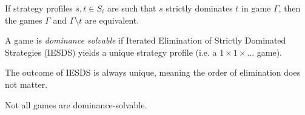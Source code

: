 	\begin{fact}
		If strategy profiles $s,t \in S_i$ are such that $s$ strictly dominates
		$t$ in game $\Gamma$, then the games $\Gamma$ and $\Gamma \setminus t$
		are equivalent.
	\end{fact}

	\begin{definition}
		A game is \textit{dominance solvable} if Iterated Elimination of
		Strictly Dominated Strategies (IESDS) yields a unique strategy profile
		(i.e. a $1 \times 1 \times \ldots$ game).
	\end{definition}

	\begin{fact}
		The outcome of IESDS is always unique, meaning the order of elimination
		does not matter.
	\end{fact}

	\begin{fact}
		Not all games are dominance-solvable.
	\end{fact}

